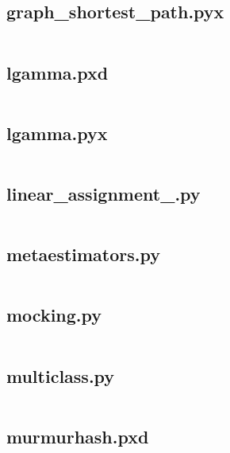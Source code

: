 \documentclass{article}
\begin{document}
\subsection{graph\_shortest\_path.pyx}
\inputminted{cython}{/home/dufferzafar/dev/@clones/scikit-learn/sklearn/utils/graph_shortest_path.pyx}
\newpage

\subsection{lgamma.pxd}
\inputminted{cython}{/home/dufferzafar/dev/@clones/scikit-learn/sklearn/utils/lgamma.pxd}
\newpage

\subsection{lgamma.pyx}
\inputminted{cython}{/home/dufferzafar/dev/@clones/scikit-learn/sklearn/utils/lgamma.pyx}
\newpage

\subsection{linear\_assignment\_.py}
\inputminted{python}{/home/dufferzafar/dev/@clones/scikit-learn/sklearn/utils/linear_assignment_.py}
\newpage

\subsection{metaestimators.py}
\inputminted{python}{/home/dufferzafar/dev/@clones/scikit-learn/sklearn/utils/metaestimators.py}
\newpage

\subsection{mocking.py}
\inputminted{python}{/home/dufferzafar/dev/@clones/scikit-learn/sklearn/utils/mocking.py}
\newpage

\subsection{multiclass.py}
\inputminted{python}{/home/dufferzafar/dev/@clones/scikit-learn/sklearn/utils/multiclass.py}
\newpage

\subsection{murmurhash.pxd}
\inputminted{cython}{/home/dufferzafar/dev/@clones/scikit-learn/sklearn/utils/murmurhash.pxd}
\newpage
\end{document}
